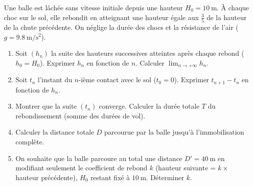 \documentclass[11pt]{article}
\begin{document}
\begin{exercice}
Une balle est lâchée sans vitesse initiale depuis une hauteur $H_0 = \SI{10}{\meter}$. À chaque choc sur le sol, elle rebondit en atteignant une hauteur égale aux $\frac{3}{5}$ de la hauteur de la chute précédente. On néglige la durée des chocs et la résistance de l'air ($g = \SI{9,8}{\meter\per\second\squared}$).
\begin{enumerate}
    \item Soit $(h_n)$ la suite des hauteurs successives atteintes après chaque rebond ($h_0 = H_0$). Exprimer $h_n$ en fonction de $n$. Calculer $\displaystyle\lim_{n\to +\infty} h_n$.
    \item Soit $t_n$ l'instant du $n$-ième contact avec le sol ($t_0 = 0$). Exprimer $t_{n+1} - t_n$ en fonction de $h_n$. 
    \item Montrer que la suite $(t_n)$ converge. Calculer la durée totale $T$ du rebondissement (somme des durées de vol).
    \item Calculer la distance totale $D$ parcourue par la balle jusqu'à l'immobilisation complète.
    \item On souhaite que la balle parcoure au total une distance $D' = \SI{40}{\meter}$ en modifiant seulement le coefficient de rebond $k$ (hauteur suivante = $k \times$ hauteur précédente), $H_0$ restant fixé à $\SI{10}{\meter}$. Déterminer $k$.
\end{enumerate}
\end{exercice}
\end{document}
